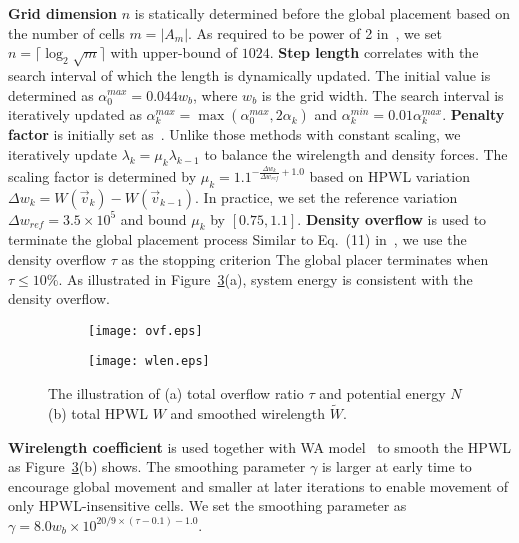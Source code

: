 \documentclass[conference,10pt]{IEEEtran}
\begin{document}
{\bf Grid dimension} $n$ is statically determined 
before the global placement based on the number of cells 
$m=|A_m|$.
As required to be power of 2 in~\cite{fft}, 
we set $n=\lceil\log_2\sqrt{m}\rceil$ with upper-bound of $1024$.
{\bf Step length} correlates with the search interval of which the 
length is dynamically updated.
The initial value is determined as 
$\alpha^{max}_0=0.044w_b$, where $w_b$ is the grid width.
The search interval is iteratively updated as 
$\alpha^{max}_{k}=\max(\alpha^{max}_0,2\alpha_{k})$ and 
$\alpha^{min}_{k}=0.01\alpha^{max}_k$.
{\bf Penalty factor} is 
initially set as~\cite{ntupl3,aplace2}. 
Unlike those methods with 
constant scaling, 
we iteratively update $\lambda_k=\mu_k\lambda_{k-1}$ 
to balance the wirelength and density forces.
The scaling factor is determined by 
$\mu_k = 1.1^{-\frac{\Delta w_k}{\Delta w_{ref}}+1.0}$
based on HPWL variation 
$\Delta w_k=W(\vec{v}_k)-W(\vec{v}_{k-1})$. 
In practice, we set the reference variation 
$\Delta w_{ref}=3.5\times 10^5$ and bound $\mu_k$ by $[0.75,1.1]$.
{\bf Density overflow} is used to terminate the 
global placement process 
Similar to Eq.~(11) in~\cite{ntupl3},
we use the density overflow $\tau$ as the stopping criterion 
The global placer terminates when $\tau\le 10\%$.
As illustrated in Figure~\ref{fig:ovf}(a), 
system energy is consistent with the density overflow.
\begin{figure}\centering
  \begin{subfigure}[b]{0.25\textwidth}
    \centering
    \texttt{[image: ovf.eps]}
    \caption{}
    \label{subfig:ovf}
  \end{subfigure}\begin{subfigure}[b]{0.25\textwidth}
    \centering
    \texttt{[image: wlen.eps]}
    \caption{}
    \label{subfig:wlen}
  \end{subfigure}
  \caption{The illustration of (a) total overflow ratio $\tau$ and potential energy $N$ (b) total HPWL $W$ and smoothed wirelength $\widetilde{W}$.}
\label{fig:ovf}
\end{figure}
{\bf Wirelength coefficient} is used together with WA model~\cite{wa} 
to smooth the HPWL as Figure~\ref{fig:ovf}(b) shows. 
The smoothing parameter $\gamma$ is larger at early time
to encourage global movement 
and smaller at later iterations to enable movement of 
only HPWL-insensitive cells.
We set the smoothing parameter as  
$\gamma = 8.0w_b\times 10^{20/9\times\left(\tau -0.1\right) - 1.0}$.
\end{document}
